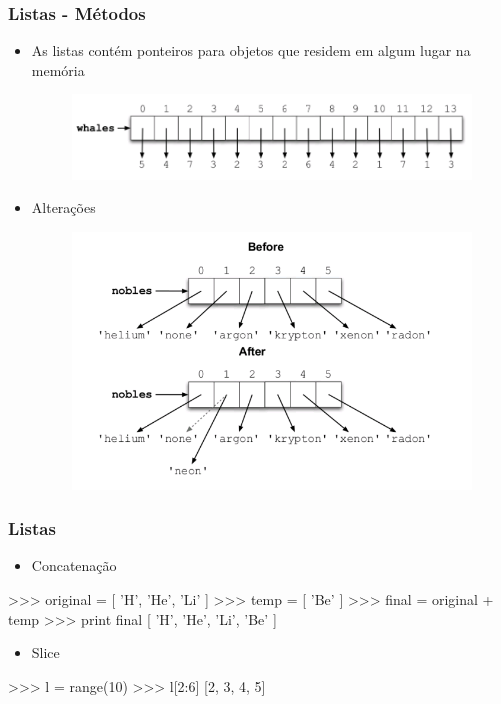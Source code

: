 \documentclass[12pt,t,graphics]{beamer}
\newcommand{\ft}[1]{\frametitle{#1}}
\newcommand{\bi}{\begin{itemize}}
\newcommand{\ei}{\end{itemize}}
\begin{document}
\begin{frame}[fragile]
  \ft{Listas - Métodos}
  \bi
\item As listas contém ponteiros para objetos que
  residem em algum lugar na memória
  \begin{figure}
    \centering
    \includegraphics[scale=0.4]{img/lista1.png}
    \label{fig:lista1}
  \end{figure}
\item Alterações
  \begin{figure}
    \centering
    \includegraphics[scale=0.375]{img/lista2.png}
    \label{fig:lista2}
  \end{figure}	
  \ei
\end{frame}


\begin{frame}[fragile]
  \ft{Listas}
  \bi
\item Concatenação	
  \ei
  \begin{python}
    >>> original = [ 'H', 'He', 'Li' ]
    >>> temp = [ 'Be' ]
    >>> final = original + temp
    >>> print final
    [ 'H', 'He', 'Li', 'Be' ]	
  \end{python}
  \bi
\item Slice
  \ei
  \begin{python}
    >>> l = range(10)
    >>> l[2:6]
    [2, 3, 4, 5]	
  \end{python}	
\end{frame}
\end{document}

